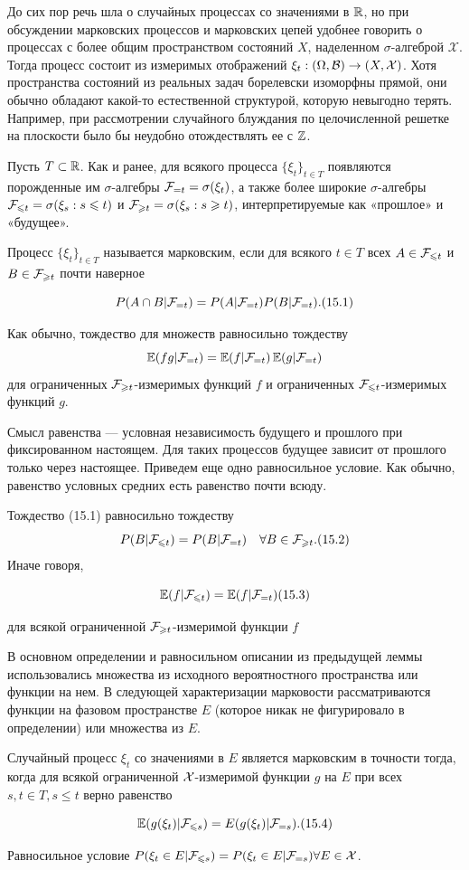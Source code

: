 До сих пор речь шла о случайных процессах со значениями в $\mathbb{R}$,
но при обсуждении марковских процессов и марковских цепей удобнее
говорить о процессах с более общим пространством состояний $X$, наделенном $\sigma$-алгеброй $\mathcal{X}$. Тогда процесс состоит из измеримых отображений $\xi_t: (\Omega, \mathcal{B}) \to (X, \mathcal{X})$. Хотя пространства состояний из реальных задач борелевски изоморфны прямой, они обычно обладают какой-то естественной структурой, которую невыгодно терять. Например, при
рассмотрении случайного блуждания по целочисленной решетке на
плоскости было бы неудобно отождествлять ее с $\mathbb{Z}$.

Пусть $T \subset \mathbb{R}$.
Как и ранее, для всякого процесса $\{\xi_t\}_{t \in T}$ появляются порожденные им $\sigma$-алгебры $\mathcal{F}_{=t} = \sigma(\xi_t)$, а также более широкие $\sigma$-алгебры
$\mathcal{F}_{\leqslant t} = \sigma(\xi_s : s \leqslant t)$ и $\mathcal{F}_{\geqslant t} = \sigma(\xi_s : s \geqslant t)$, интерпретируемые как «прошлое» и «будущее».
\begin{definition}
    Процесс $\{\xi_t\}_{t \in T}$ называется марковским, если для всякого $t \in T$ всех $A \in \mathcal{F}_{\leqslant t}$ и $B \in \mathcal{F}_{\geqslant t}$ почти наверное 
    
    \[ P(A \cap B|\mathcal{F}_{=t}) = P(A|\mathcal{F}_{=t})P(B|\mathcal{F}_{=t}). (15.1) \]
    
    Как обычно, тождество для множеств равносильно тождеству
    \[ \operatorname{\mathbb{E}}(fg|\mathcal{F}_{=t}) = \operatorname{\mathbb{E}}(f|\mathcal{F}_{=t})\operatorname{\mathbb{E}}(g|\mathcal{F}_{=t}) \]
    для ограниченных $\mathcal{F}_{\geqslant t}$-измеримых функций $f$ и ограниченных $\mathcal{F}_{\leqslant t}$-измеримых функций $g$.
\end{definition}

Смысл равенства — условная независимость будущего и прошлого при фиксированном настоящем. Для таких процессов будущее зависит от прошлого только через настоящее. Приведем еще одно равносильное условие. Как обычно, равенство условных средних есть равенство почти всюду.
\begin{lemma}
    Тождество (15.1) равносильно тождеству
    \[ P(B|\mathcal{F}_{\leqslant t}) = P(B|\mathcal{F}_{=t}) \quad \forall B \in \mathcal{F}_{\geqslant t}. (15.2) \]
    Иначе говоря,
    
    \[ \operatorname{\mathbb{E}}(f|\mathcal{F}_{\leqslant t}) = \operatorname{\mathbb{E}}(f|\mathcal{F}_{=t}) (15.3) \]
    
    для всякой ограниченной $\mathcal{F}_{\geqslant t}$-измеримой функции $f$
\end{lemma} 

В основном определении и равносильном описании из предыдущей леммы использовались множества из исходного вероятностного
пространства или функции на нем. В следующей характеризации марковости рассматриваются функции на фазовом пространстве $E$ (которое никак не фигурировало в определении) или множества из $E$.
\begin{theorem}
    Случайный процесс $\xi_t$ со значениями в $E$ является марковским в точности тогда, когда для всякой ограниченной $\mathcal{X}$-измеримой функции $g$ на $E$ при всех $s, t \in T, s \leq t$ верно равенство
    
    \[ \operatorname{\mathbb{E}}(g(\xi_t)|\mathcal{F}_{\leqslant s}) = E(g(\xi_t)|\mathcal{F}_{=s}). (15.4) \]

    Равносильное условие $P(\xi_t \in E|\mathcal{F}_{\leqslant s}) = P(\xi_t \in E|\mathcal{F}_{=s}) \forall E \in \mathcal{X}$.
\end{theorem}

